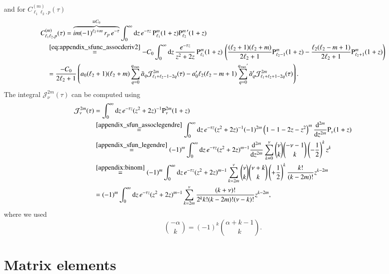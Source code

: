 and for $C_{\ell_1\ell_2,p}^{(m)}(\tau)$
\begin{align}
\nonumber
&C_{\ell_1\ell_2,p}^{(m)}(\tau) = \overbrace{i m (-1)^{\ell_2+m} \, r_p \, e^{-\tau}}^{\equiv C_0} \int_0^\infty \mathrm{d}z \, e^{-\tau z} \, {\text{P}_{\ell_1}^{m}}(1+z) {\text{P}_{\ell_2}^{m}}^\prime(1+z) \\
\nonumber
&\quad\overset{\eqref{eq:appendix_sfunc_assocderiv2}}{=} -C_0 \int_0^\infty \mathrm{d}z \, \frac{e^{-\tau z}}{z^2+2z} \, {\text{P}_{\ell_1}^{m}}(1+z) \, \left( \frac{(\ell_2+1)(\ell_2+m)}{2\ell_2+1} {\text{P}_{\ell_2-1}^{m}}(1+z) - \frac{\ell_2(\ell_2-m+1)}{2\ell_2+1} {\text{P}_{\ell_2+1}^{m}}(1+z) \right) \\
&\quad = \frac{-C_0}{2\ell_2+1} \left(
    a_0 (\ell_2+1)(\ell_2+m) \sum_{q=0}^{q_\text{max}} \tilde a_q \mathcal{J}_{\ell_1+\ell_2-1-2q}^{2m}(\tau)
    - a_0^\prime \ell_2(\ell_2-m+1) \sum_{q=0}^{{q_\text{max}}^\prime} \tilde a_q^\prime \mathcal{J}_{\ell_1+\ell_2+1-2q}^{2m}(\tau) \right).
\end{align}
The integral $\mathcal{J}_\nu^{2m}(\tau)$ can be computed using
\begin{align}
\nonumber
\mathcal{J}_\nu^{2m}(\tau) &= \int_0^\infty \mathrm{d}z \, e^{-\tau z} (z^2+2z)^{-1} {\text{P}_{\nu}^{2m}}(1+z) \\
\nonumber
&\overset{\eqref{appendix_sfun_assoclegendre}}{=} \int_0^\infty \mathrm{d}z \, e^{-\tau z} (z^2+2z)^{-1} (-1)^{2m} \left(1-1-2z-z^2\right)^m \frac{\mathrm{d}^{2m}}{\mathrm{d}z^{2m}} {\text{P}_{\nu}^{}}(1+z) \\
\nonumber
&\overset{\eqref{appendix_sfun_legendre}}{=} (-1)^m \int_0^\infty \mathrm{d}z \, e^{-\tau z} (z^2+2z)^{m-1} \frac{\mathrm{d}^{2m}}{\mathrm{d}z^{2m}} \sum_{k=0}^\nu \binom{\nu}{k} \binom{-\nu-1}{k} \left(-\frac{1}{2}\right)^k z^k \\
\nonumber
&\overset{\eqref{appendix:binom}}{=} (-1)^m \int_0^\infty \mathrm{d}z \, e^{-\tau z} (z^2+2z)^{m-1} \sum_{k=2m}^\nu \binom{\nu}{k} \binom{\nu+k}{k} \left(+\frac{1}{2}\right)^k \frac{k!}{(k-2m)!} z^{k-2m} \\
&= (-1)^m \int_0^\infty \mathrm{d}z \, e^{-\tau z} (z^2+2z)^{m-1} \sum_{k=2m}^\nu \frac{(k+\nu)!}{2^k k! (k-2m)! (\nu-k)!} z^{k-2m},
\end{align}
where we used
\begin{equation}
\label{appendix:binom}
\binom{-\alpha}{k} = (-1)^k \binom{\alpha+k-1}{k}.
\end{equation}

\section{Matrix elements}

